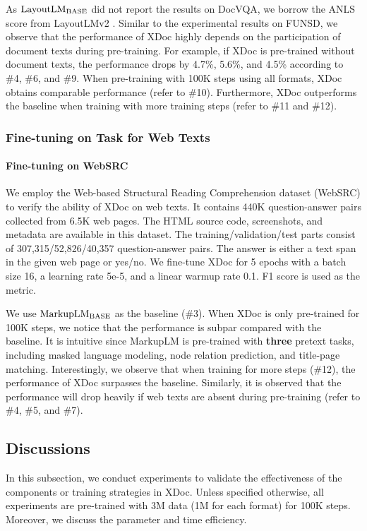 \documentclass[11pt]{article}
\begin{document}
As ${\rm LayoutLM_{BASE}}$ \cite{xu2020layoutlm} did not report the results on DocVQA, we borrow the ANLS score from LayoutLMv2 \cite{xu2020layoutlmv2}. Similar to the experimental results on FUNSD, we observe that the performance of XDoc highly depends on the participation of document texts during pre-training. For example, if XDoc is pre-trained without document texts, the performance drops by 4.7\%, 5.6\%, and 4.5\% according to \#4, \#6, and \#9. When pre-training with 100K steps using all formats, XDoc obtains comparable performance (refer to \#10). Furthermore, XDoc outperforms the baseline when training with more training steps (refer to \#11 and \#12).

\subsubsection{Fine-tuning on Task for Web Texts}
\paragraph{Fine-tuning on WebSRC}
We employ the Web-based Structural Reading Comprehension dataset (WebSRC) \cite{chen2021websrc} to verify the ability of XDoc on web texts. It contains 440K question-answer pairs collected from 6.5K web pages. The HTML source code, screenshots, and metadata are available in this dataset. The training/validation/test parts consist of 307,315/52,826/40,357 question-answer pairs. The answer is either a text span in the given web page or yes/no. We fine-tune XDoc for 5 epochs with a batch size 16, a learning rate 5e-5, and a linear warmup rate 0.1. F1 score is used as the metric. 

We use ${\rm MarkupLM_{BASE}}$ \cite{li2021markuplm} as the baseline (\#3). When XDoc is only pre-trained for 100K steps, we notice that the performance is subpar compared with the baseline. It is intuitive since MarkupLM is pre-trained with \textbf{three} pretext tasks, including masked language modeling, node relation prediction, and title-page matching. Interestingly, we observe that when training for more steps (\#12), the performance of XDoc surpasses the baseline. Similarly, it is observed that the performance will drop heavily if web texts are absent during pre-training (refer to \#4, \#5, and \#7).






\subsection{Discussions} \label{sec:discussion}
In this subsection, we conduct experiments to validate the effectiveness of the components or training strategies in XDoc. Unless specified otherwise, all experiments are pre-trained with 3M data (1M for each format) for 100K steps. Moreover, we discuss the parameter and time efficiency.
\end{document}
